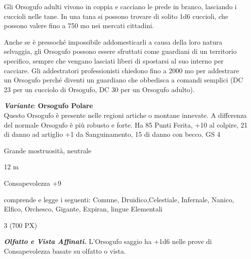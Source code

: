 \begin{multicols}{2}
{Gli Orsogufo adulti vivono in coppia e cacciano le prede in branco, lasciando i cuccioli nelle tane. In una tana si possono trovare di solito 1d6 cuccioli, che possono valere fino a 750 mo nei mercati cittadini.

Anche se è pressoché impossibile addomesticarli a causa della loro natura selvaggia, gli Orsogufo possono essere sfruttati come guardiani di un territorio specifico, sempre che vengano lasciati liberi di spostarsi al suo interno per cacciare. Gli addestratori professionisti chiedono fino a 2000 mo per addestrare un Orsogufo perché diventi un guardiano che obbedisca a comandi semplici (DC 23 per un cucciolo di Orsogufo, DC 30 per un Orsogufo adulto).

\emph{\textbf{Variante}}: \textbf{Orsogufo Polare}\\
Questo Orsogufo è presente nelle regioni artiche o montane innevate. A differenza del normale Orsogufo è più robusto e forte. Ha 85 Punti Ferita, +10 al colpire, 21 di danno ad artiglio +1 da Sanguinamento, 15 di danno con becco. GS 4

\begin{description}[noitemsep, topsep=0pt, parsep=0pt, partopsep=0pt, itemsep=1pt, leftmargin=2.35cm,  labelwidth=2.2cm, itemindent=0cm, listparindent=0pt] %
\setlength{\baselineskip}{10pt}
\item[\textbf{Taglia/Tipo}] Grande mostruosità, neutrale
\item[\textbf{Caratt.}] 
\item[\textbf{Punti Ferita}] 
\item[\textbf{Movimento}] 12 m
\item[\textbf{Tiri Salvez.}] 
\item[\textbf{Comp.}] Consapevolezza +9
\item[\textbf{Sensi}] 
\item[\textbf{Linguaggi}] comprende e legge i seguenti: Comune, Druidico,Celestiale, Infernale, Nanico, Elfico, Orchesco, Gigante, Expiran, lingue Elementali
\item[\textbf{Sfida}] 3 (700 PX)
\end{description}
\smallskip

\emph{\textbf{Olfatto e Vista Affinati.}} L'Orsogufo saggio ha +1d6 nelle prove di Consapevolezza basate su olfatto o vista.

}
\end{multicols}
